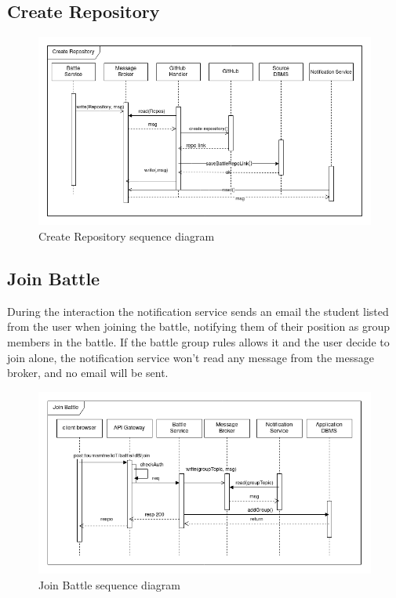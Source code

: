 \subsection{Create Repository}

\begin{figure}[H]
    \centering
    \includegraphics[width=1\linewidth]{misc//Images//UC/UC6.png}
    \caption{Create Repository sequence diagram}
    \label{fig:enter-label}
\end{figure}
\newpage
\subsection{Join Battle}

During the interaction the notification service sends an email the student listed from the user when joining the battle, notifying them of their position as group members in the battle.
If the battle group rules allows it and the user decide to join alone, the notification service won't read any message from the message broker, and no email will be sent.

\begin{figure}[H]
    \centering
    \includegraphics[width=1\linewidth]{misc//Images//UC/UC7.png}
    \caption{Join Battle sequence diagram}
    \label{fig:enter-label}
\end{figure}
\newpage
